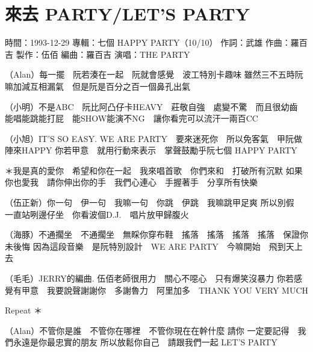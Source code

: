 \documentclass[UTF8,a4paper,oneside,twocolumn,12pt]{ctexbook}
\newcommand{\infopair}[2]{\textbullet #1：#2}
\newcommand{\zc}[1][伍佰]{\infopair{作詞}{#1}}
\newcommand{\zq}[1][伍佰]{\infopair{作曲}{#1}}
\newcommand{\bq}[1][伍佰]{\infopair{編曲}{#1}}
\newcommand{\zj}[1]{\infopair{專輯}{#1}}
\newcommand{\zz}[1]{\infopair{製作}{#1}}
\newcommand{\sj}[1]{\infopair{時間}{#1}}
\newenvironment{info}{\begin{flushleft}\kaishu
	}
	{\end{flushleft}\normalsize\yahei\par}
\newenvironment{lyric}{
	}
{}
\begin{document}
\section{來去 PARTY/LET'S PARTY}
\begin{info}
	\sj{1993-12-29}
	\zj{七個 HAPPY PARTY（10/10）}
	\zc[武雄]
	\zq[羅百吉]
	\zz{伍佰}
	\bq[羅百吉]
	\infopair{演唱}{THE PARTY}
\end{info}
\begin{lyric}
	（Alan）每一擺　阮若湊在一起　阮就會感覺　波工特別卡趣味
	雖然三不五時阮嘛加減互相漏氣　但是阮是百分之百一個鼻孔出氣

	（小明）不是ABC　阮比阿凸仔卡HEAVY　莊敬自強　處變不驚　而且很幼齒
	能唱能跳能打屁　能SHOW能演不NG　讓你看完可以流汗一兩百CC

	（小旭）IT'S SO EASY. WE ARE PARTY　要來迷死你　所以免客氣　甲阮做陣來HAPPY
	你若甲意　就用行動來表示　掌聲鼓勵乎阮七個 HAPPY PARTY

	＊我是真的愛你　希望和你在一起　我來唱首歌　你們來和　打破所有沉默
	如果你也愛我　請你伸出你的手　我們心連心　手握著手　分享所有快樂

	（伍正新）你一句　伊一句　我嘛一句　你跳　伊跳　我嘛跳甲足爽
	所以別假　一直站咧邊仔坐　你看波個D.J.　唱片放甲歸腹火

	（海豚）不通擱坐　不通擱坐　無睬你穿布鞋　搖落　搖落　搖落　搖落　保證你未後悔
	因為這段音樂　是阮特別設計　WE ARE PARTY　今嘛開始　飛到天上去

	（毛毛）JERRY的編曲. 伍佰老師很用力　關心不噁心　只有爆笑沒暴力
	你若感覺有甲意　我要說聲謝謝你　多謝魯力　阿里加多　THANK YOU VERY MUCH

	Repeat ＊

	（Alan）不管你是誰　不管你在哪裡　不管你現在在幹什麼
	請你 一定要記得　我們永遠是你最忠實的朋友
	所以放鬆你自己　請跟我們一起
	LET'S PARTY
\end{lyric}
\end{document}
